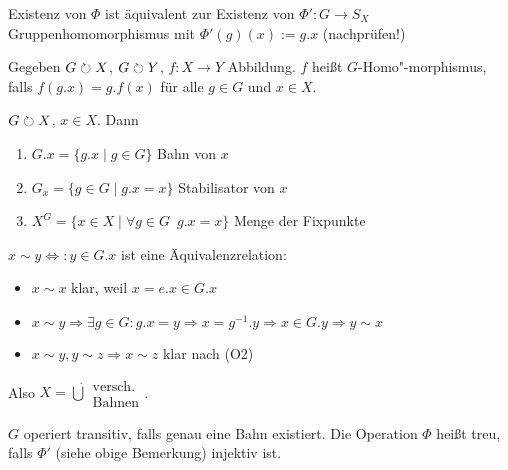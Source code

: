 \documentclass[12pt,a4paper]{scrartcl}
\begin{document}
\begin{bem}
	Existenz von $\Phi$ ist äquivalent zur Existenz von $\Phi'\colon G\to S_X$ Gruppenhomomorphismus mit $\Phi'(g)(x) := g.x$ (nachprüfen!)
\end{bem}

\begin{defi}
	Gegeben $G\circlearrowright X$, $G\circlearrowright Y$, $f\colon X\to Y$ Abbildung. $f$ heißt $G$-Homo"-morphismus, falls $f(g.x) = g.f(x)$ für alle $g\in G$ und $x\in X$.
\end{defi}

\begin{defi}
	$G\circlearrowright X$, $x\in X$. Dann\begin{enumerate}
		\item $G.x = \{g.x\mid g\in G\}$ Bahn von $x$
		\item $G_x = \{g\in G\mid g.x = x\}$ Stabilisator von $x$
		\item $X^G = \{x\in X\mid \forall g\in G\enspace g.x = x\}$ Menge der Fixpunkte
	\end{enumerate}
\end{defi}

\begin{bem}
	$x\sim y \Leftrightarrow : y\in G.x$ ist eine Äquivalenzrelation:\begin{itemize}
		\item $x\sim x$ klar, weil $x = e.x\in G.x$
		\item $x\sim y\Rightarrow \exists g\in G: g.x = y\Rightarrow x = g^{-1}.y\Rightarrow x\in G.y\Rightarrow y\sim x$
		\item $x\sim y, y\sim z\Rightarrow x\sim z$ klar nach (O2)
	\end{itemize}
	Also $X=\dot\bigcup\substack{\text{versch.}\\\text{Bahnen}}$.
\end{bem}

\begin{defi}
	$G$ operiert transitiv, falls genau eine Bahn existiert. Die Operation $\Phi$ heißt treu, falls $\Phi'$ (siehe obige Bemerkung) injektiv ist.
\end{defi}
\end{document}
